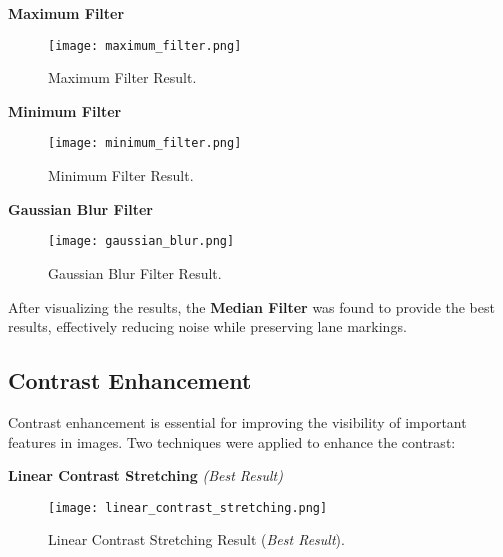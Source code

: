 \documentclass[12pt,a4paper]{article}
\begin{document}
\newpage %

\vspace{1em} %
\textbf{Maximum Filter}

\begin{figure}[h!]
    \centering
    \texttt{[image: maximum\_filter.png]} %
    \caption{Maximum Filter Result.}
    \label{fig:maximum_filter}
\end{figure}

\vspace{1em} %
\textbf{Minimum Filter}

\begin{figure}[h!]
    \centering
    \texttt{[image: minimum\_filter.png]} %
    \caption{Minimum Filter Result.}
    \label{fig:minimum_filter}
\end{figure}

\vspace{1em} %
\textbf{Gaussian Blur Filter}

\begin{figure}[h!]
    \centering
    \texttt{[image: gaussian\_blur.png]} %
    \caption{Gaussian Blur Filter Result.}
    \label{fig:gaussian_blur}
\end{figure}

After visualizing the results, the \textbf{Median Filter} was found to provide the best results, effectively reducing noise while preserving lane markings.




\newpage %

\subsection{Contrast Enhancement}

Contrast enhancement is essential for improving the visibility of important features in images. Two techniques were applied to enhance the contrast:

\vspace{1em} %
 \textbf{Linear Contrast Stretching} \textit{(Best Result)}

\begin{figure}[h!]
    \centering
    \texttt{[image: linear\_contrast\_stretching.png]} %
    \caption{Linear Contrast Stretching Result (\textit{Best Result}).}
    \label{fig:linear_contrast_stretching}
\end{figure}
\end{document}
